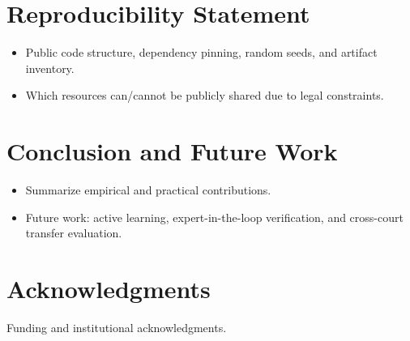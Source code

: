 \documentclass[a4paper,fleqn]{cas-sc}
\begin{document}
\section{Reproducibility Statement}
\label{sec:reproducibility}
\begin{itemize}
    \item Public code structure, dependency pinning, random seeds, and artifact inventory.
    \item Which resources can/cannot be publicly shared due to legal constraints.
\end{itemize}

\section{Conclusion and Future Work}
\label{sec:conclusion}
\begin{itemize}
    \item Summarize empirical and practical contributions.
    \item Future work: active learning, expert-in-the-loop verification, and cross-court transfer evaluation.
\end{itemize}

\section*{Acknowledgments}
Funding and institutional acknowledgments.

\printcredits


\end{document}
